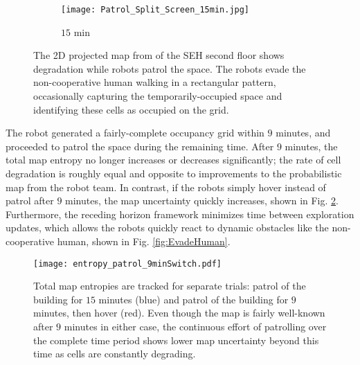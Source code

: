 \begin{figure}[!t]
{\begin{subfigure}[t]{0.25\columnwidth}
    	\end{subfigure}
	\hspace*{0.05\textwidth}
    	\begin{subfigure}[t]{0.25\columnwidth}
          	\texttt{[image: Patrol\_Split\_Screen\_15min.jpg]}
        		\caption{$15$ min}
    	\end{subfigure}
	}
	\caption{The 2D projected map from of the SEH second floor shows degradation while robots patrol the space. The robots evade the non-cooperative human walking in a rectangular pattern, occasionally capturing the temporarily-occupied space and identifying these cells as occupied on the grid.}
	\label{fig:Sim2DMapPatrol}
\end{figure}




The robot generated a fairly-complete occupancy grid within $9$ minutes, and proceeded to patrol the space during the remaining time. After $9$ minutes, the total map entropy no longer increases or decreases significantly; the rate of cell degradation is roughly equal and opposite to improvements to the probabilistic map from the robot team. In contrast, if the robots simply hover instead of patrol after $9$ minutes, the map uncertainty quickly increases, shown in Fig. \ref{fig:DegradeExamples}. Furthermore, the receding horizon framework minimizes time between exploration updates, which allows the robots quickly react to dynamic obstacles like the non-cooperative human, shown in Fig. \ref{fig:EvadeHuman}.

\begin{figure}
\centering
\texttt{[image: entropy\_patrol\_9minSwitch.pdf]}
\caption{Total map entropies are tracked for separate trials: patrol of the building for $15$ minutes (blue) and patrol of the building for $9$ minutes, then hover (red). Even though the map is fairly well-known after $9$ minutes in either case, the continuous effort of patrolling over the complete time period shows lower map uncertainty beyond this time as cells are constantly degrading.}
\label{fig:DegradeExamples}
\end{figure}


